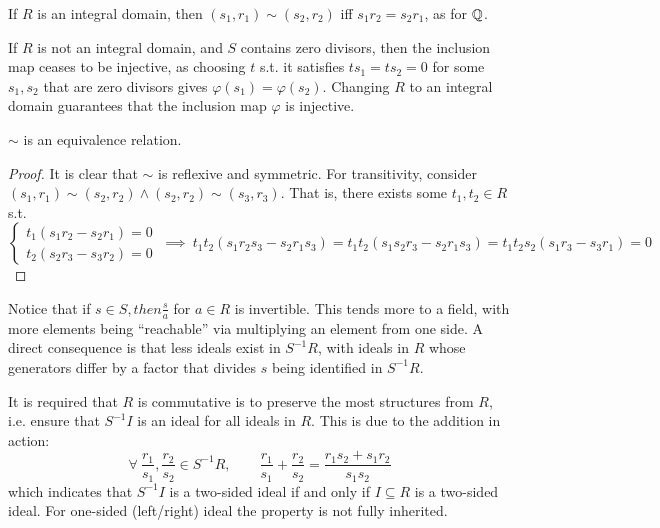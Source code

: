 \begin{remark}\upshape
    If $R$ is an integral domain, then $(s_1, r_1) \sim (s_2, r_2)$ iff $s_1 r_2 = s_2 r_1$, as for $\mathbb{Q}$.
\end{remark}

\begin{remark}
    If $R$ is not an integral domain, and $S$ contains zero divisors, then the inclusion map ceases to be injective, as choosing $t$ s.t. it satisfies $ts_1 = ts_2 = 0$ for some $s_1, s_2$ that are zero divisors gives $\varphi(s_1) = \varphi(s_2)$. Changing $R$ to an integral domain guarantees that the inclusion map $\varphi$ is injective.
\end{remark}

\begin{proposition}
    $\sim$ is an equivalence relation.
\end{proposition}

\begin{proof}
    It is clear that $\sim$ is reflexive and symmetric. For transitivity, consider $(s_1, r_1)\sim (s_2, r_2) \wedge (s_2, r_2)\sim (s_3, r_3)$. That is, there exists some $t_1, t_2\in R$ s.t. 
    \[
        \begin{cases}
            t_1 (s_1 r_2 - s_2 r_1) = 0 \\ t_2 (s_2 r_3 - s_3 r_2) = 0 
        \end{cases}
        \ \implies\ t_1 t_2 (s_1 r_2 s_3 - s_2 r_1 s_3) = t_1 t_2 (s_1 s_2 r_3 - s_2 r_1 s_3) = t_1 t_2 s_2 (s_1 r_3 - s_3 r_1) = 0
    \]
\end{proof}

\begin{remark}
    Notice that if $s\in S, then \frac{s}{a}$ for $a\in R$ is invertible. This tends more to a field, with more elements being ``reachable'' via multiplying an element from one side. A direct consequence is that less ideals exist in $S^{-1}R$, with ideals in $R$ whose generators differ by a factor that divides $s$ being identified in $S^{-1}R$. 
\end{remark}

\begin{remark}
    It is required that $R$ is commutative is to preserve the most structures from $R$, i.e. ensure that $S^{-1}I$ is an ideal for all ideals in $R$. This is due to the addition in action:
    \[
        \forall\ \frac{r_1}{s_1}, \frac{r_2}{s_2} \in S^{-1}R, \qquad \frac{r_1}{s_1} + \frac{r_2}{s_2} = \frac{r_1 s_2 + s_1 r_2}{s_1 s_2} 
    \]
    which indicates that $S^{-1}I$ is a two-sided ideal if and only if $I\subseteq R$ is a two-sided ideal. For one-sided (left/right) ideal the property is not fully inherited. 
\end{remark}

